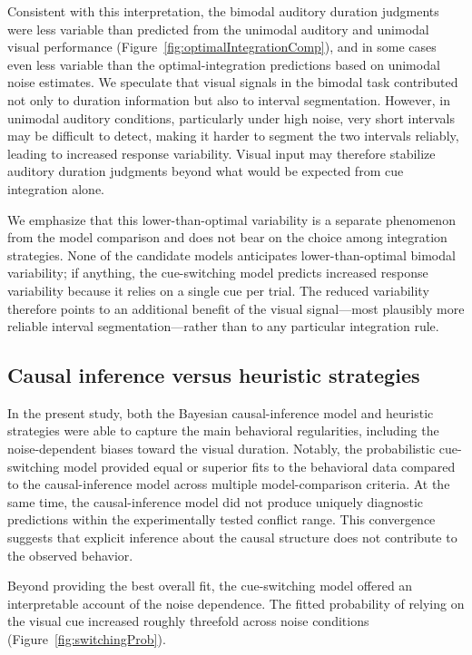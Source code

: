 \documentclass{biorxiv}
\begin{document}
Consistent with this interpretation, the bimodal auditory duration judgments were less variable than predicted from the unimodal auditory and unimodal visual performance (Figure~\ref{fig:optimalIntegrationComp}), and in some cases even less variable than the optimal-integration predictions based on unimodal noise estimates. We speculate that visual signals in the bimodal task contributed not only to duration information but also to interval segmentation. However, in unimodal auditory conditions, particularly under high noise, very short intervals may be difficult to detect, making it harder to segment the two intervals reliably, leading to increased response variability. Visual input may therefore stabilize auditory duration judgments beyond what would be expected from cue integration alone.

We emphasize that this lower-than-optimal variability is a separate phenomenon from the model comparison and does not bear on the choice among integration strategies. None of the candidate models anticipates lower-than-optimal bimodal variability; if anything, the cue-switching model predicts increased response variability because it relies on a single cue per trial. The reduced variability therefore points to an additional benefit of the visual signal---most plausibly more reliable interval segmentation---rather than to any particular integration rule.

\subsection{Causal inference versus heuristic strategies}

In the present study, both the Bayesian causal-inference model and heuristic strategies were able to capture the main behavioral regularities, including the noise-dependent biases toward the visual duration. Notably, the probabilistic cue-switching model provided equal or superior fits to the behavioral data compared to the causal-inference model across multiple model-comparison criteria. At the same time, the causal-inference model did not produce uniquely diagnostic predictions within the experimentally tested conflict range. This convergence suggests that explicit inference about the causal structure does not contribute to the observed behavior. 

Beyond providing the best overall fit, the cue-switching model offered an interpretable account of the noise dependence. The fitted probability of relying on the visual cue increased roughly threefold across noise conditions (Figure~\ref{fig:switchingProb}).
\end{document}
